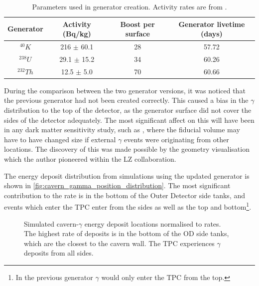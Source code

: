 \begin{table}
    \centering
    \begin{tabular}{c|c|c|c}
        Generator    & Activity (Bq/kg)   & Boost per surface & Generator livetime (days)  \\ \hline
        ${}^{40}K$   & 216 $\pm$ 60.1     & 28                & 57.72                      \\
        ${}^{238}U$  & 29.1 $\pm$ 15.2    & 34                & 60.26                      \\
        ${}^{232}Th$ & 12.5 $\pm$ 5.0     & 70                & 60.66
    \end{tabular}
    \caption{Parameters used in generator creation. Activity rates are from \cite{LZ_Gamma_Ray_Background_ref}.}
    \label{tab:cavern_gamma_generator_parameters}
\end{table}





\par
During the comparison between the two generator versions, it was noticed that the previous generator had not been created correctly.
This caused a bias in the $\gamma$ distribution to the top of the detector, as the generator surface did not cover the sides of the detector adequately.
The most significant affect on this will have been in any dark matter sensitivity study, such as \cite{lz_simulations_ref}, where the fiducial volume may have to have changed size if external $\gamma$ events were originating from other locations.
The discovery of this was made possible by the geometry visualisation which the author pioneered within the LZ collaboration.

\par
The energy deposit distribution from simulations using the updated generator is shown in \autoref{fig:cavern_gamma_position_distribution}.
The most significant contribution to the rate is in the bottom of the Outer Detector side tanks, and events which enter the TPC enter from the sides as well as the top and bottom\footnote{In the previous generator $\gamma$ would only enter the TPC from the top.}.

\begin{figure}
    \centering
    \resizebox{\textwidth}{!}{

}
    \caption[Simulated cavern-$\gamma$ energy deposit locations normalised to rates.]{Simulated cavern-$\gamma$ energy deposit locations normalised to rates.
             The highest rate of deposits is in the bottom of the OD side tanks, which are the closest to the cavern wall.
             The TPC experiences $\gamma$ deposits from all sides.}
    \label{fig:cavern_gamma_position_distribution}
\end{figure}